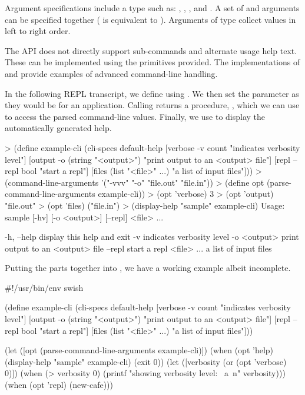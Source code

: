 Argument specifications include a type such as: ,
, , and .  A set of 
and  arguments can be specified together ( is
equivalent to   ). Arguments of type
 collect values in left to right order.

The API does not directly support sub-commands and alternate usage
help text. These can be implemented using the primitives provided. The
implementations of  and  provide
examples of advanced command-line handling.

In the following REPL transcript, we define  using
. We then set the 
parameter as they would be for an application. Calling
 returns a procedure, ,
which we can use to access the parsed command-line values. Finally, we use
 to display the automatically generated help.

\codebegin
> (define example-cli
    (cli-specs
     default-help
     [verbose -v count "indicates verbosity level"]
     [output -o (string "<output>") "print output to an <output> file"]
     [repl --repl bool "start a repl"]
     [files (list "<file>" ...) "a list of input files"]))
> (command-line-arguments '("-vvv" "-o" "file.out" "file.in"))
> (define opt (parse-command-line-arguments example-cli))
> (opt 'verbose)
3
> (opt 'output)
"file.out"
> (opt 'files)
("file.in")
> (display-help "sample" example-cli)
Usage: sample [-hv] [-o <output>] [--repl] <file> ...

  -h, --help        display this help and exit
  -v                indicates verbosity level
  -o <output>       print output to an <output> file
  --repl            start a repl
  <file> ...        a list of input files
\codeend

Putting the parts together into , we have a working
example albeit incomplete.

\codebegin\fixtilde
#!/usr/bin/env swish

(define example-cli
  (cli-specs
   default-help
   [verbose -v count "indicates verbosity level"]
   [output -o (string "<output>") "print output to an <output> file"]
   [repl --repl bool "start a repl"]
   [files (list "<file>" ...) "a list of input files"]))

(let ([opt (parse-command-line-arguments example-cli)])
  (when (opt 'help)
    (display-help "sample" example-cli)
    (exit 0))
  (let ([verbosity (or (opt 'verbose) 0)])
    (when (> verbosity 0)
      (printf "showing verbosity level: ~a~n" verbosity)))
  (when (opt 'repl)
    (new-cafe)))
\codeend

